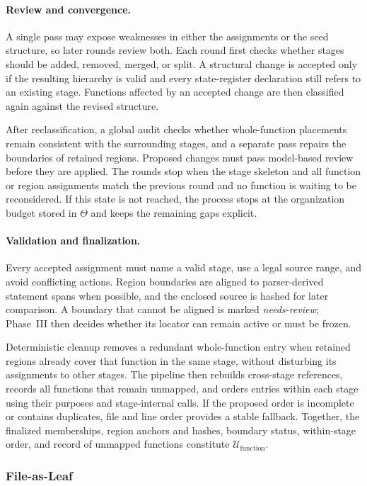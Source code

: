 \documentclass[]{ailab}
\begin{document}
\paragraph{Review and convergence.}
A single pass may expose weaknesses in either the assignments or the seed
structure, so later rounds review both. Each round first checks whether stages
should be added, removed, merged, or split. A structural change is accepted
only if the resulting hierarchy is valid and every state-register declaration
still refers to an existing stage. Functions affected by an accepted change are
then classified again against the revised structure.

After reclassification, a global audit checks whether whole-function placements
remain consistent with the surrounding stages, and a separate pass repairs the
boundaries of retained regions. Proposed changes must pass model-based
review before they are applied. The rounds stop when the stage skeleton and all
function or region assignments match the
previous round and no function is waiting to be reconsidered. If this state is
not reached, the process stops at the organization budget stored in $\Theta$ and
keeps the remaining gaps explicit.

\paragraph{Validation and finalization.}
Every accepted assignment must name a valid stage, use a legal source range, and
avoid conflicting actions. Region boundaries are aligned to parser-derived
statement spans when possible, and the enclosed source is hashed for later
comparison. A boundary that cannot be aligned is marked \emph{needs-review};
Phase~III then decides whether its locator can remain active or must be frozen.

Deterministic cleanup removes a redundant whole-function entry when retained
regions already cover that function in the same stage, without disturbing its
assignments to other stages. The pipeline then rebuilds cross-stage references,
records all functions that remain unmapped, and orders entries within each stage
using their purposes and stage-internal calls. If the proposed order is incomplete
or contains duplicates, file and line order provides a stable fallback. Together,
the finalized memberships, region anchors and hashes, boundary status, within-stage
order, and record of unmapped functions constitute $\mathcal{U}_{\mathrm{function}}$.

\subsubsection{File-as-Leaf}
\end{document}
